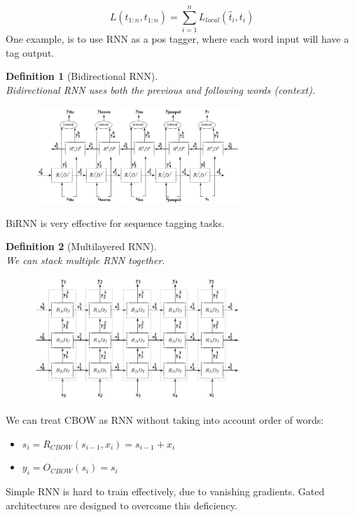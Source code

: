 \documentclass[12pt]{article}
\newtheorem{definition}{Definition}[section]
\theoremstyle{definition}
\begin{document}
\[
L(\hat{t}_{1:n}, t_{1:n}) = \sum_{i=1}^n L_{local}(\hat{t}_i, t_i)
\]
One example, is to use RNN as a pos tagger, where each word input will have a tag output.
\begin{definition}[Bidirectional RNN]
\hfill\\\normalfont Bidirectional RNN uses both the previous and following words (context).
\begin{figure}[h]
\centering
\includegraphics[width=0.7\textwidth]{birnn.jpg}
\end{figure}
\end{definition}
BiRNN is very effective for sequence tagging tasks.
\begin{definition}[Multilayered RNN]
\hfill\\\normalfont
We can stack multiple RNN together.
\begin{figure}[h]
\centering
\includegraphics[width=0.7\textwidth]{multilayerrnn.jpg}
\end{figure}
\end{definition}
We can treat CBOW as RNN without taking into account order of words:
\begin{itemize}
	\item $s_i =R_{CBOW}(s_{i-1}, x_i) = s_{i-1} + x_i$
	\item $y_i = O_{CBOW}(s_i)=s_i$
\end{itemize}
Simple RNN is hard to train effectively, due to vanishing gradients. Gated architectures are designed to overcome this deficiency.
\end{document}

